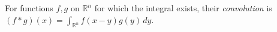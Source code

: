 
For functions $f,g$ on $\mathbb R^n$ for which the integral exists, their \emph{convolution} is $(f*g)(x)=\int_{\mathbb R^n}f(x-y)g(y)\,dy$.
